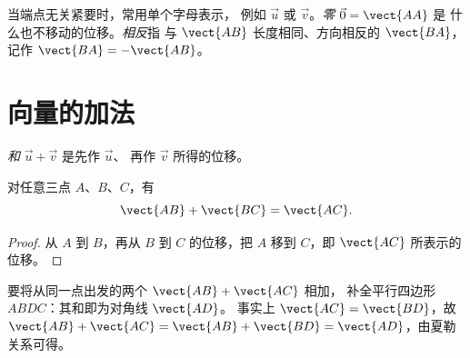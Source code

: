 \begin{notation}
当端点无关紧要时，常用单个字母表示，
例如 $\vec u$ 或 $\vec v$。\emph{零} $\vec 0 = \vect{AA}$ 是
什么也不移动的位移。\emph{相反}指
与 $\vect{AB}$ 长度相同、方向相反的 $\vect{BA}$，
记作 $\vect{BA} = -\vect{AB}$。
\end{notation}

\section{向量的加法}

\begin{definition}[两个向量的和]\label{def:g10:vectors:sum}
\emph{和} $\vec u + \vec v$ 是先作 $\vec u$、
再作 $\vec v$ 所得的位移。
\end{definition}

\begin{theorem}[夏勒关系]\label{thm:g10:vectors:chasles}
对任意三点 $A$、$B$、$C$，有
\[
\vect{AB} + \vect{BC} = \vect{AC}.
\]
\end{theorem}

\begin{proof}
从 $A$ 到 $B$，再从 $B$ 到 $C$ 的位移，把
$A$ 移到 $C$，即 $\vect{AC}$ 所表示的位移。
\end{proof}

\begin{remark}[平行四边形法则]
要将从同一点出发的两个 $\vect{AB} + \vect{AC}$ 相加，
补全平行四边形 $ABDC$：其和即为对角线 $\vect{AD}$。
事实上 $\vect{AC} = \vect{BD}$，故
$\vect{AB} + \vect{AC} = \vect{AB} + \vect{BD} = \vect{AD}$，由夏勒
关系可得。
\end{remark}

